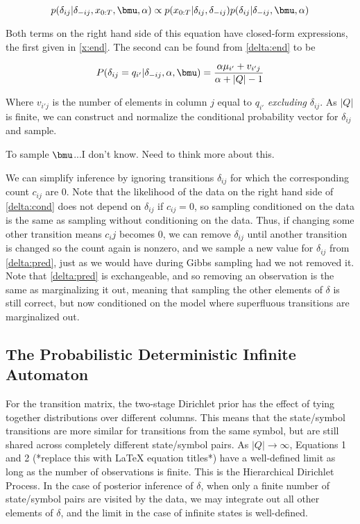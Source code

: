 \begin{equation}
p(\delta_{ij}|\delta_{-ij},x_{0:T},\bmu,\alpha) \propto p(x_{0:T}|\delta_{ij},\delta_{-ij})p(\delta_{ij}|\delta_{-ij},\bmu,\alpha) \label{delta:cond}
\end{equation}

Both terms on the right hand side of this equation have closed-form expressions, the first given in \eqref{x:end}.  The second can be found from \eqref{delta:end} to be

\begin{equation}
P(\delta_{ij} = q_{i'}|\delta_{-ij},\alpha,\bmu) = \frac{\alpha\mu_{i'} + v_{i'j}}{\alpha + |Q| - 1} \label{delta:pred}
\end{equation}

Where $v_{i'j}$ is the number of elements in column $j$ equal to $q_{i'}$ {\em excluding} $\delta_{ij}$.  As $|Q|$ is finite, we can construct and normalize the conditional probability vector for $\delta_{ij}$ and sample.

To sample $\bmu$...I don't know.  Need to think more about this.

We can simplify inference by ignoring transitions $\delta_{ij}$ for which the corresponding count $c_{ij}$ are 0.  Note that the likelihood of the data on the right hand side of \eqref{delta:cond} does not depend on $\delta_{ij}$ if $c_{ij} = 0$, so sampling conditioned on the data is the same as sampling without conditioning on the data.  Thus, if changing some other transition means $c_ij$ becomes 0, we can remove $\delta_{ij}$ until another transition is changed so the count again is nonzero, and we sample a new value for $\delta_{ij}$ from \eqref{delta:pred}, just as we would have during Gibbs sampling had we not removed it.  Note that \eqref{delta:pred} is exchangeable, and so removing an observation is the same as marginalizing it out, meaning that sampling the other elements of $\delta$ is still correct, but now conditioned on the model where superfluous transitions are marginalized out.
 
 \subsection{The Probabilistic Deterministic Infinite Automaton}
 
 For the transition matrix, the two-stage Dirichlet prior has the effect of tying together distributions over different columns.  This means that the state/symbol transitions are more similar for transitions from the same symbol, but are still shared across completely different state/symbol pairs.  As $|Q|\rightarrow\infty$, Equations 1 and 2 (*replace this with LaTeX equation titles*) have a well-defined limit as long as the number of observations is finite.  This is the Hierarchical Dirichlet Process.  In the case of posterior inference of $\delta$, when only a finite number of state/symbol pairs are visited by the data, we may integrate out all other elements of $\delta$, and the limit in the case of infinite states is well-defined.
 
